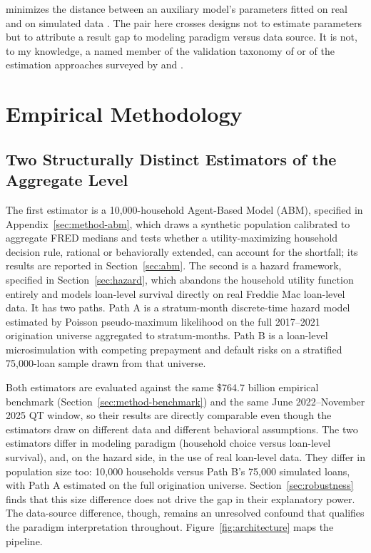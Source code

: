 \documentclass[12pt]{article}
\begin{document}
minimizes the distance between an auxiliary model's parameters fitted on real and on simulated data \citep{platt2020}. The pair here crosses designs not to estimate parameters but to attribute a result gap to modeling paradigm versus data source. It is not, to my knowledge, a named member of the validation taxonomy of \citet{fagiolo2007} or of the estimation approaches surveyed by \citet{grazzini2017} and \citet{platt2020}.
\section{Empirical Methodology}\label{sec:method}

\subsection{Two Structurally Distinct Estimators of the Aggregate Level}\label{sec:method-estimators}

The first estimator is a 10,000-household Agent-Based Model (ABM), specified in Appendix~\ref{sec:method-abm}, which draws a synthetic population calibrated to aggregate FRED medians and tests whether a utility-maximizing household decision rule, rational or behaviorally extended, can account for the shortfall; its results are reported in Section~\ref{sec:abm}. The second is a hazard framework, specified in Section~\ref{sec:hazard}, which abandons the household utility function entirely and models loan-level survival directly on real Freddie Mac loan-level data. It has two paths. Path A is a stratum-month discrete-time hazard model estimated by Poisson pseudo-maximum likelihood on the full 2017--2021 origination universe aggregated to stratum-months. Path B is a loan-level microsimulation with competing prepayment and default risks on a stratified 75,000-loan sample drawn from that universe.

Both estimators are evaluated against the same \$764.7 billion empirical benchmark (Section~\ref{sec:method-benchmark}) and the same June 2022--November 2025 QT window, so their results are directly comparable even though the estimators draw on different data and different behavioral assumptions. The two estimators differ in modeling paradigm (household choice versus loan-level survival), and, on the hazard side, in the use of real loan-level data. They differ in population size too: 10,000 households versus Path B's 75,000 simulated loans, with Path A estimated on the full origination universe. Section~\ref{sec:robustness} finds that this size difference does not drive the gap in their explanatory power. The data-source difference, though, remains an unresolved confound that qualifies the paradigm interpretation throughout. Figure~\ref{fig:architecture} maps the pipeline.
\end{document}
